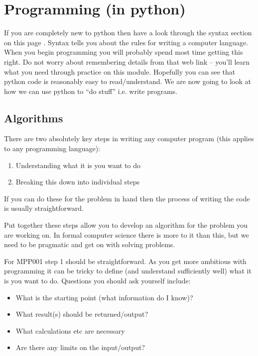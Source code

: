 \documentclass[letterpaper,10pt,english]{jupyterBook}
\begin{document}
\sphinxstepscope


\chapter{Programming (in python)}
\label{\detokenize{ProgInPython:programming-in-python}}\label{\detokenize{ProgInPython::doc}}
\sphinxAtStartPar
If you are completely new to python then have a look through the syntax section on this page . Syntax tells you about the rules for writing a computer language. When you begin programming you will probably spend most time getting this right. Do not worry about remembering details from that web link – you’ll learn what you need through practice on this module. Hopefully you can see that python code is reasonably easy to read/understand. We are now going to look at how we can use python to “do stuff” i.e. write programs.


\section{Algorithms}
\label{\detokenize{ProgInPython:algorithms}}
\sphinxAtStartPar
There are two absolutely key steps in writing any computer program (this applies to any programming language):
\begin{enumerate}
%
\item {} 
\sphinxAtStartPar
Understanding what it is you want to do

\item {} 
\sphinxAtStartPar
Breaking this down into individual steps

\end{enumerate}

\sphinxAtStartPar
If you can do these for the problem in hand then the process of writing the code is usually straightforward.

\sphinxAtStartPar
Put together these steps allow you to develop an algorithm for the problem you are working on. In formal computer science there is more to it than this, but we need to be pragmatic and get on with solving problems.

\sphinxAtStartPar
For MPP001 step 1 should be straightforward. As you get more ambitious with programming it can be tricky to define (and understand sufficiently well) what it is you want to do. Questions you should ask yourself include:
\begin{itemize}
\item {} 
\sphinxAtStartPar
What is the starting point (what information do I know)?

\item {} 
\sphinxAtStartPar
What result(s) should be returned/output?

\item {} 
\sphinxAtStartPar
What calculations etc are necessary

\item {} 
\sphinxAtStartPar
Are there any limits on the input/output?

\end{itemize}
\end{document}
